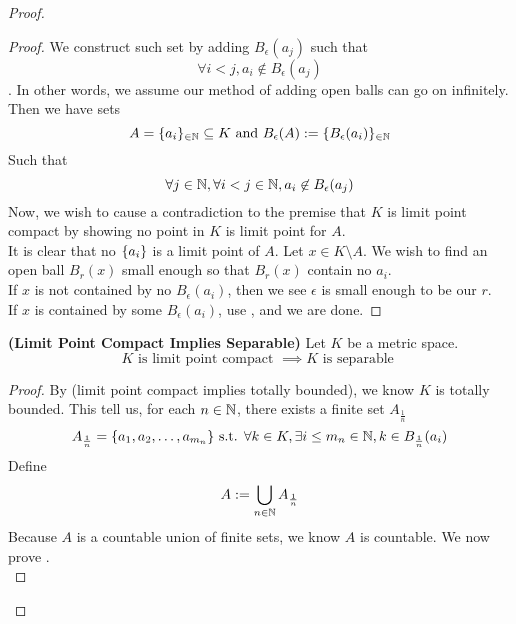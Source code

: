 \documentclass{report}
\begin{document}
\begin{proof}
\begin{proof}
We construct such set by adding  $B_{\epsilon }(a_j)$ such that 
\begin{equation}
\forall i<j,a_i \not\in B_\epsilon (a_j)
\end{equation}
. In other words, we assume our method of adding open balls can go on infinitely. Then we have sets 
\begin{equation}
A=\{ a_i \}_{\in\mathbb{N}}\subseteq K\text{ and }B_\epsilon (A):=\{ B_\epsilon (a_i) \}_{\in\mathbb{N}}
\end{equation}
Such that
\begin{equation}
\forall j\in\mathbb{N},\forall i<j\in\mathbb{N}, a_i\not\in B_{\epsilon }(a_j) 
\end{equation}
Now, we wish to cause a contradiction to the premise that $K$ is limit point compact by showing no point in $K$ is limit point for $A$.\\

It is clear that no $\{ a_i \}$ is a limit point of $A$. Let $x\in K\setminus A$. We wish to find an open ball $B_r(x)$ small enough so that $B_r(x)$ contain no $a_i$.\\

If $x$ is not contained by no  $B_\epsilon (a_i)$, then we see $\epsilon $ is small enough to be our $r$.\\

If $x$ is contained by some  $B_\epsilon (a_i)$, use , and we are done. \CaC
\end{proof}
\begin{theorem}
\label{3.5.4}
\textbf{(Limit Point Compact Implies Separable)} Let $K$ be a metric space.
\begin{equation}
K\text{ is limit point compact }\implies K\text{ is separable }
\end{equation}
\end{theorem}
\begin{proof}
 By  (limit point compact implies totally bounded), we know $K$ is totally bounded. This tell us, for each $n\in\mathbb{N}$, there exists a finite set $A_{\frac{1}{n}}$ 
\begin{equation}
  A_{\frac{1}{n}}=\{ a_1,a_2,\dots ,a_{m_n} \}\text{ s.t. }\forall k\in K,\exists i\leq m_n\in\mathbb{N}, k\in B_{\frac{1}{n}}(a_i)
\end{equation}
Define
\begin{equation}
A:=\bigcup_{n\in\mathbb{N}}A_{\frac{1}{n}}
\end{equation}
Because $A$ is a countable union of finite sets, we know $A$ is countable. We now prove .\\



\end{proof}
\end{proof}
\end{document}
